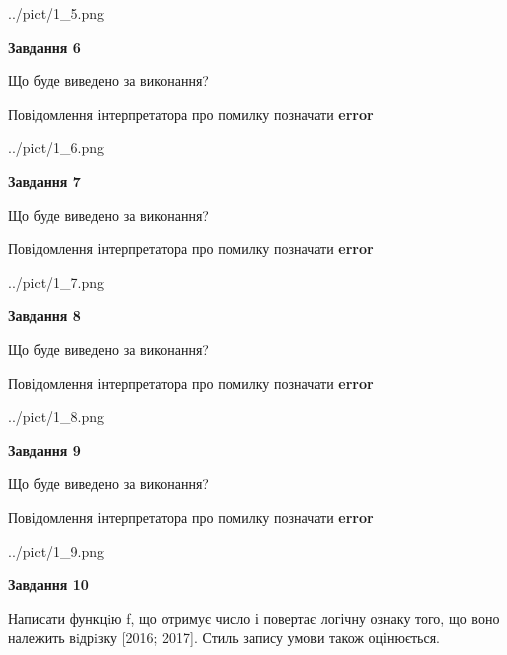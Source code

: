 \documentclass[12pt, ukrainian]{article}
\begin{document}
{\begin {large}
\begin{center}
	{../pict/1_5.png}
\end{center}
\newpage

{\begin {center}\textbf{Завдання 6}\end {center}}\par
Що буде виведено за виконання? \par
Повідомлення інтерпретатора про помилку позначати \textbf{error}

\begin{center}
	{../pict/1_6.png}
\end{center}
\newpage

{\begin {center}\textbf{Завдання 7}\end {center}}\par
Що буде виведено за виконання? \par
Повідомлення інтерпретатора про помилку позначати \textbf{error}

\begin{center}
	{../pict/1_7.png}
\end{center}
\newpage

{\begin {center}\textbf{Завдання 8}\end {center}}\par
Що буде виведено за виконання? \par
Повідомлення інтерпретатора про помилку позначати \textbf{error}

\begin{center}
	{../pict/1_8.png}
\end{center}
\newpage

{\begin {center}\textbf{Завдання 9}\end {center}}\par
Що буде виведено за виконання? \par
Повідомлення інтерпретатора про помилку позначати \textbf{error}

\begin{center}
	{../pict/1_9.png}
\end{center}
\newpage

{\begin {center}\textbf{Завдання 10}\end {center}}\par

Написати функцiю f, що отримує число і повертає логічну ознаку того, що воно належить вiдрiзку [2016; 2017]. Стиль запису умови також оцінюється.\par
\newpage

\end {large}}
\end{document}
